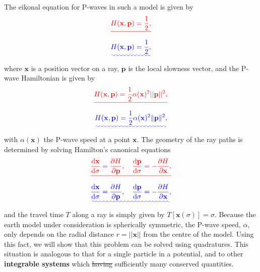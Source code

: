 \documentclass [a4paper,12pt]{paper}
\providecommand{\DIFadd}[1]{{\protect\color{blue}\uwave{#1}}} %
\providecommand{\DIFdel}[1]{{\protect\color{red}\sout{#1}}}                      %
\providecommand{\DIFaddbegin}{} %
\providecommand{\DIFaddend}{} %
\providecommand{\DIFdelbegin}{} %
\providecommand{\DIFdelend}{} %
\begin{document}
The eikonal equation for P-waves in such a model is given by
\DIFdelbegin \begin{displaymath}
\DIFdel{H(\mathbf{x},\mathbf{p})=\frac{1}{2},
}\end{displaymath}%
\DIFdelend \DIFaddbegin \begin{equation}
\DIFadd{H(\mathbf{x},\mathbf{p})=\frac{1}{2},
\label{eq:3}
}\end{equation}\DIFaddend 
where $\mathbf{x}$ is a position vector on a ray, $\mathbf{p}$ is the local slowness vector, and the P-wave Hamiltonian is given by
\DIFdelbegin \begin{displaymath}
\DIFdel{H(\mathbf{x},\mathbf{p})=\frac{1}{2}\alpha(\mathbf{x})^{2}||\mathbf{p}||^{2},
}\end{displaymath}%
\DIFdelend \DIFaddbegin \begin{equation}
\DIFadd{H(\mathbf{x},\mathbf{p})=\frac{1}{2}\alpha(\mathbf{x})^{2}\|\mathbf{p}\|^{2},
\label{eq:4}
}\end{equation}\DIFaddend 
with $\alpha(\mathbf{x})$ the P-wave speed at a point $\mathbf{x}$. The geometry of the ray paths is determined by solving Hamilton's canonical equations
\DIFdelbegin \begin{displaymath}
\DIFdel{\frac{\ddns \mathbf{x}}{\ddns \sigma}=\frac{\partial H}{\partial \mathbf{p}}, \quad \frac{\ddns \mathbf{p}}{\ddns \sigma}=-\frac{\partial H}{\partial \mathbf{x}},
}\end{displaymath}%
\DIFdelend \DIFaddbegin \begin{equation}
\DIFadd{\frac{\ddns \mathbf{x}}{\ddns \sigma}=\frac{\partial H}{\partial \mathbf{p}},\quad \frac{\ddns \mathbf{p}}{\ddns \sigma}=-\frac{\partial H}{\partial \mathbf{x}},
\label{eq:5}
}\end{equation}\DIFaddend 
and the travel time $T$ along a ray is simply given by $T[\mathbf{x}(\sigma)]=\sigma$. Because the earth model under 
consideration is spherically symmetric, the P-wave speed, 
$\alpha$, only depends on the radial distance \DIFdelbegin \DIFdel{$r=||\mathbf{x}||$ }\DIFdelend \DIFaddbegin \DIFadd{$r=\|\mathbf{x}\|$ }\DIFaddend from the centre of the model. Using this fact, we will show that 
this problem can be solved using quadratures. 
This situation is analogous to that for a single particle in a \DIFaddbegin \DIFadd{central }\DIFaddend potential, and to other \textbf{integrable systems}
 which \DIFdelbegin \DIFdel{having }\DIFdelend \DIFaddbegin \DIFadd{have }\DIFaddend sufficiently many conserved quantities.
\end{document}
